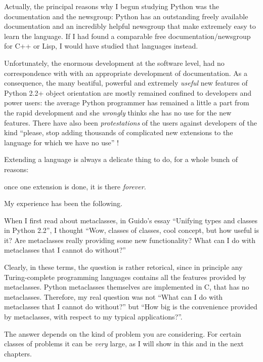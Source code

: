\documentclass[11pt,english]{book}
\begin{document}
Actually, the principal reasons why I begun studying 
Python was the documentation and the newsgroup: Python has an outstanding 
freely available documentation and an incredibly helpful newsgroup that
make extremely easy to learn the language. If I had found a comparable 
free documentation/newsgroup for C++ or Lisp, I would have studied that
languages instead.

Unfortunately, the enormous development at the software level, had no
correspondence with with an appropriate development of documentation.
As a consequence, the many beatiful, powerful and extremely \emph{useful}
new features of Python 2.2+ object orientation are mostly remained
confined to developers and power users: the average Python programmer
has remained a little a part from the rapid development and she
\emph{wrongly} thinks she has no use for the new features. There have
also been \emph{protestations} of the users against developers of the
kind ``please, stop adding thousands of complicated new extensions
to the language for which we have no use'' !

Extending a language is always a delicate thing to do, for a whole
bunch of reasons:
\begin{list}{.}
{
\setlength{\rightmargin}{\leftmargin}
}
\item 
once one extension is done, it is there \emph{forever}.

\end{list}

My experience has been the following.

When I first read about metaclasses, in Guido's essay
``Unifying types and classes in Python 2.2'', I thought ``Wow,
classes of classes, cool concept, but how useful is it?  
Are metaclasses really providing some new functionality?  
What can I do with metaclasses that I cannot do without?''

Clearly, in these terms, the question is rather retorical, since in principle
any Turing-complete programming languages contains all the features provided 
by metaclasses. Python metaclasses themselves are implemented in C, that has 
no metaclasses. Therefore, my real question was not ``What can I do 
with metaclasses that I cannot do without?'' but ``How big is the convenience 
provided by metaclasses, with respect to my typical applications?''.

The answer depends on the kind of problem you are considering. For certain
classes of problems it can be \emph{very} large, as I will show in this and in
the next chapters.
\end{document}
